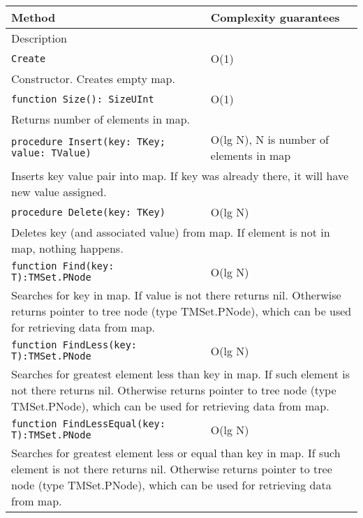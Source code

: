 \begin{longtable}{|m{10cm}|m{5cm}|}
\hline
Method & Complexity guarantees \\ \hline
\multicolumn{2}{|m{15cm}|}{Description} \\ \hline\hline

\verb!Create! & O(1) \\ \hline
\multicolumn{2}{|m{15cm}|}{Constructor. Creates empty map.} \\ \hline\hline

\verb!function Size(): SizeUInt! & O(1) \\ \hline
\multicolumn{2}{|m{15cm}|}{Returns number of elements in map.} \\\hline\hline

\verb!procedure Insert(key: TKey; value: TValue)! &
O(lg N), N is number of elements in map \\ \hline
\multicolumn{2}{|m{15cm}|}{Inserts key value pair into map. If key was already there, it will have
new value assigned.} \\\hline\hline

\verb!procedure Delete(key: TKey)! &
O(lg N) \\ \hline
\multicolumn{2}{|m{15cm}|}{Deletes key (and associated value) from map. If element is not in map, nothing happens.} \\\hline\hline

\verb!function Find(key: T):TMSet.PNode! & O(lg N) \\\hline
\multicolumn{2}{|m{15cm}|}{Searches for key in map. If value is not there returns nil. Otherwise
returns pointer to tree node (type TMSet.PNode), which can be used for retrieving data from map.} \\\hline\hline

\verb!function FindLess(key: T):TMSet.PNode! & O(lg N) \\\hline
\multicolumn{2}{|m{15cm}|}{Searches for greatest element less than key in map. If such element is not there returns nil. Otherwise
returns pointer to tree node (type TMSet.PNode), which can be used for retrieving data from map.} \\\hline\hline

\verb!function FindLessEqual(key: T):TMSet.PNode! & O(lg N) \\\hline
\multicolumn{2}{|m{15cm}|}{Searches for greatest element less or equal than key in map. If such element is not there returns nil. Otherwise
returns pointer to tree node (type TMSet.PNode), which can be used for retrieving data from map.} \\\hline\hline


\end{longtable}
